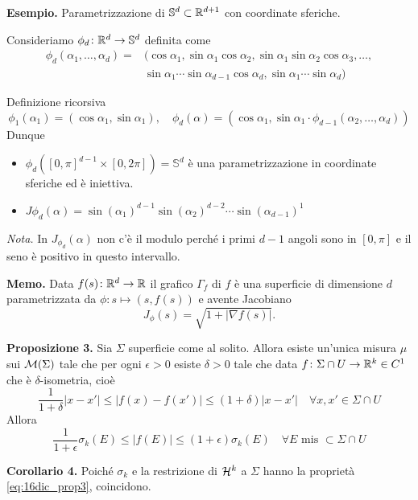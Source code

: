 \textbf{Esempio.} Parametrizzazione di $\mathbb{S}^d \subset \mathbb R^{d+1}$ con coordinate sferiche.

Consideriamo $\phi_d \colon \mathbb R^d \to \mathbb{S}^d$ definita come 
%
\begin{align*}
	\phi_d(\alpha_1,\ldots,\alpha_d) = & ( \cos \alpha_1, \sin \alpha_1 \cos \alpha_2, \sin \alpha_1 \sin \alpha_2 \cos \alpha_3,\ldots, \\
	& \sin \alpha_1 \cdots \sin \alpha_{d-1} \cos \alpha_d, \sin \alpha_1 \cdots \sin \alpha_d ) 
\end{align*}

Definizione ricorsiva
%
$$
\phi_1 (\alpha_1) = (\cos \alpha_1, \sin \alpha_1), \quad 
\phi_d(\alpha) = (\cos \alpha_1, \sin \alpha_1 \cdot \phi_{d-1}(\alpha_2,\ldots,\alpha_d))
$$
%
Dunque 
\begin{itemize}

	\item $\phi_d \left( [0,\pi]^{d-1} \times [0,2\pi] \right) = \mathbb{S}^d$ è una parametrizzazione in coordinate sferiche ed è iniettiva.

	\item $J\phi_d(\alpha) = \sin(\alpha_1)^{d-1} \sin(\alpha_2)^{d-2} \cdots \sin(\alpha_{d-1})^1$

\end{itemize}

\textit{Nota.} In $J_{\phi_d}(\alpha)$ non c'è il modulo perché i primi $d-1$ angoli sono in $[0,\pi]$ e il seno è positivo in questo intervallo.

\textbf{Memo.} Data $f(s) \colon \mathbb R^d \to \mathbb R$ il grafico $\Gamma_f$ di $f$ è una superficie di dimensione $d$ parametrizzata da $\phi \colon s \mapsto (s,f(s))$ e avente Jacobiano
$$
	J_\phi(s) = \sqrt{1 + |\nabla f(s)|}.
$$


\textbf{Proposizione 3.} Sia $\Sigma$ superficie come al solito. Allora esiste un'unica misura $\mu$ sui $\mathcal{M}(\Sigma)$ tale che per ogni $\epsilon > 0$ esiste $\delta > 0$ tale che data $f \colon \Sigma \cap U \to \mathbb R^k \in C^1$ che è $\delta$-isometria, cioè
%
\begin{equation}
	\label{eq:16dic_prop3} \tag{P}
	\frac{1}{1 + \delta} |x-x'| \leq |f(x) - f(x')| \leq (1+\delta)|x-x'| \quad \forall x,x' \in \Sigma \cap U
\end{equation}
Allora
%
$$
	\frac{1}{1+\epsilon} \sigma_k(E) \leq |f(E)| \leq (1+\epsilon)\sigma_k(E) \quad \forall E \text{ mis } \subset \Sigma \cap U
$$
%

\textbf{Corollario 4.} Poiché $\sigma_k$ e la restrizione di $\mathcal{H}^k$ a $\Sigma$ hanno la proprietà \eqref{eq:16dic_prop3}, coincidono.

